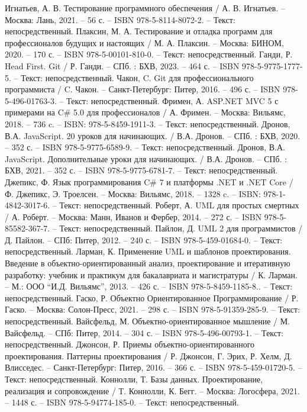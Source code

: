 \begin{thebibliography}{9}
	 Игнатьев, А. В. Тестирование программного обеспечения / А. В. Игнатьев. – Москва: Лань, 2021. – 56 с. – ISBN 978-5-8114-8072-2. – Текст: непосредственный.
	 Плаксин, М. А. Тестирование и отладка программ для профессионалов будущих и настоящих / М. А. Плаксин. – Москва: БИНОМ, 2020. – 170 с. – ISBN 978-5-00101-810-0. – Текст: непосредственный.
	 Ганди, Р. Head First. Git / Р. Ганди. – СПб. : БХВ, 2023. – 464 с. – ISBN 978-5-9775-1777-5. – Текст: непосредственный.
	 Чакон, C. Git для профессионального программиста / C. Чакон. – Санкт-Петербург: Питер, 2016. – 496 с. – ISBN 978-5-496-01763-3. – Текст: непосредственный.
	 Фримен, А. ASP.NET MVC 5 с примерами на C\# 5.0 для профессионалов / А. Фримен. – Москва: Вильямс, 2018. – 736 c. – ISBN: 978-5-8459-1911-3. – Текст: непосредственный.
	 Дронов, В.А. JavaScript. 20 уроков для начинающих. / В.А. Дронов. – СПб. : БХВ, 2020. – 352 с. – ISBN 978-5-9775-6589-9. – Текст: непосредственный.
	 Дронов, В.А. JavaScript. Дополнительные уроки для начинающих. / В.А. Дронов. – СПб. : БХВ, 2021. – 352 с. – ISBN 978-5-9775-6781-7. – Текст: непосредственный.
	 Джепикс, Ф. Язык программирования C\# 7 и платформы .NET и .NET Core / Ф. Джепикс, Э. Троелсен. – Москва: Вильямс, 2018. – 1328 c. – ISBN: 978-1-4842-3017-6. – Текст: непосредственный.
	 Роберт, А. UML для простых смертных / А. Роберт. – Москва: Манн, Иванов и Фербер, 2014. – 272 с. – ISBN 978-5-85582-367-7. – Текст: непосредственный.
	 Пайлон, Д. UML 2 для программистов / Д. Пайлон. – СПб: Питер, 2012. – 240 с. – ISBN 978-5-459-01684-0. – Текст: непосредственный.
	 Ларман, К. Применение UML и шаблонов проектирования. Введение в объектно-ориентированный анализ, проектирование и итеративную разработку: учебник и практикум для бакалавриата и магистратуры / К. Ларман. – М.: ООО “И.Д. Вильямс”, 2013. – 426 с. – ISBN 978-5-8459-1185-8.. – Текст: непосредственный.
	 Гаско, Р. Объектно Ориентированное Программирование / Р. Гаско. – Москва: Солон-Пресс, 2021. – 298 с. – ISBN 978-5-91359-285-9. – Текст: непосредственный.
	 Вайсфельд, М. Объектно-ориентированное мышление / М. Вайсфельд. – СПб: Питер, 2014. – 304 с. – ISBN 978-5-496-00793-1. – Текст: непосредственный.
	 Джонсон, Р. Приемы объектно-ориентированного проектирования. Паттерны проектирования / Р. Джонсон, Г. Эрих, Р. Хелм, Д. Влисседес. – Санкт-Петербург: Питер, 2016. – 366 с. – ISBN 978-5-459-01720-5. – Текст: непосредственный.
	 Коннолли, Т. Базы данных. Проектирование, реализация и сопровождение / Т. Коннолли, К. Бегг. – Москва: Логосфера, 2021. – 1448 с. – ISBN 978-5-94774-185-0. – Текст: непосредственный.

\end{thebibliography}
